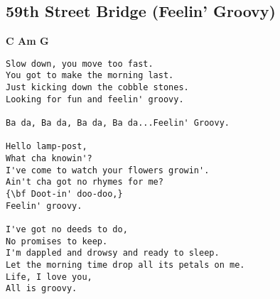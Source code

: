 \documentclass[a4paper]{article}
\begin{document}
\subsection{59th Street Bridge (Feelin' Groovy)} %
\label{sub:59th Street Bridge (Feelin' Groovy)}
{\bf C    Am    G}
\begin{Verbatim}[commandchars=\\\{\}]
Slow down, you move too fast.
You got to make the morning last.
Just kicking down the cobble stones.
Looking for fun and feelin' groovy.

Ba da, Ba da, Ba da, Ba da...Feelin' Groovy.

Hello lamp-post,
What cha knowin'?
I've come to watch your flowers growin'.
Ain't cha got no rhymes for me?
{\bf Doot-in' doo-doo,}
Feelin' groovy.

I've got no deeds to do,
No promises to keep.
I'm dappled and drowsy and ready to sleep.
Let the morning time drop all its petals on me.
Life, I love you,
All is groovy.
\end{Verbatim}
\newpage
\end{document}
